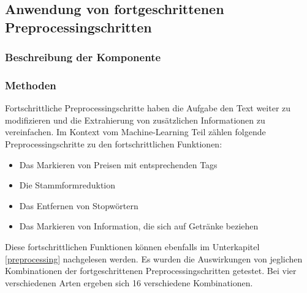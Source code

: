 \subsection{Anwendung von fortgeschrittenen Preprocessingschritten}
\subsubsection{Beschreibung der Komponente}
\subsubsection{Methoden}
Fortschrittliche Preprocessingschritte haben die Aufgabe den Text weiter zu modifizieren und die Extrahierung von zusätzlichen Informationen zu vereinfachen.
Im Kontext vom Machine-Learning Teil zählen folgende Preprocessingschritte zu den fortschrittlichen Funktionen:
\begin{itemize}
	\item Das Markieren von Preisen mit entsprechenden Tags
	\item Die Stammformreduktion
	\item Das Entfernen von Stopwörtern
	\item Das Markieren von Information, die sich auf Getränke beziehen
\end{itemize}
Diese fortschrittlichen Funktionen können ebenfalls im Unterkapitel \ref{preprocessing} nachgelesen werden.
Es wurden die Auswirkungen von jeglichen Kombinationen der fortgeschrittenen Preprocessingschritten getestet.
Bei vier verschiedenen Arten ergeben sich 16 verschiedene Kombinationen.
